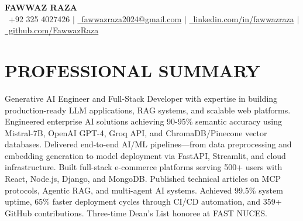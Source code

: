 \documentclass[letterpaper,10pt]{article}
\begin{document}
\begin{center}
    \textbf{\Huge FAWWAZ RAZA} \\ \vspace{2pt}
    \small \faPhone\ +92 325 4027426 $|$ 
    \href{mailto:fawwazraza2024@gmail.com}{\faEnvelope\ fawwazraza2024@gmail.com} $|$ 
    \href{https://linkedin.com/in/fawwazraza}{\faLinkedin\ linkedin.com/in/fawwazraza} $|$
    \href{https://github.com/FawwazRaza}{\faGithub\ github.com/FawwazRaza}
\end{center}

\section{PROFESSIONAL SUMMARY}
\small{Generative AI Engineer and Full-Stack Developer with expertise in building production-ready LLM applications, RAG systems, and scalable web platforms. Engineered enterprise AI solutions achieving 90-95\% semantic accuracy using Mistral-7B, OpenAI GPT-4, Groq API, and ChromaDB/Pinecone vector databases. Delivered end-to-end AI/ML pipelines—from data preprocessing and embedding generation to model deployment via FastAPI, Streamlit, and cloud infrastructure. Built full-stack e-commerce platforms serving 500+ users with React, Node.js, Django, and MongoDB. Published technical articles on MCP protocols, Agentic RAG, and multi-agent AI systems. Achieved 99.5\% system uptime, 65\% faster deployment cycles through CI/CD automation, and 359+ GitHub contributions. Three-time Dean's List honoree at FAST NUCES.}

\end{document}
